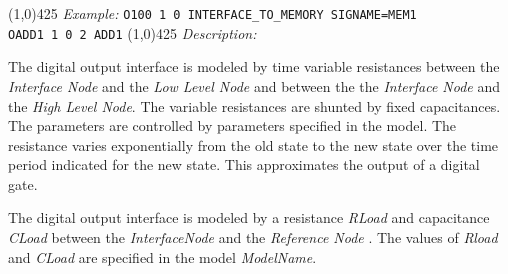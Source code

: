 \linethickness{0.5mm} \line(1,0){425}
\newline
\textit{Example:}
\newline
\texttt{O100 1 0 INTERFACE\_TO\_MEMORY SIGNAME=MEM1 \\
    OADD1 1 0 2 ADD1}
\newline
\linethickness{0.5mm} \line(1,0){425}
\newline
\textit{Description:}\\

The digital output interface is modeled by time variable
resistances between the {\it Interface Node} and the {\it Low
Level Node} and between the the {\it Interface Node} and the {\it
High Level Node}. The variable resistances are shunted by fixed
capacitances. The parameters are controlled by parameters
specified in the model. The resistance varies exponentially from
the old state to the new state over the time period indicated for
the new state. This approximates the output of a digital gate.

 The digital output interface is modeled by a resistance {\it
RLoad} and capacitance {\it CLoad} between the {\it InterfaceNode}
and the {\it Reference Node }. The values of {\it Rload} and {\it
CLoad} are specified in the model {\it ModelName}.

